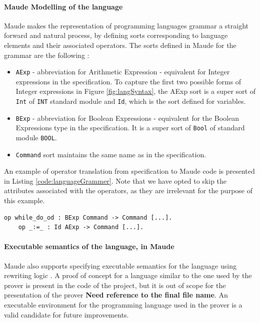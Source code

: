 \documentclass[12pt,a4paper]{article}
\begin{document}
{\paragraph{Maude Modelling of the language}
Maude makes the representation of programming languages grammar a straight forward and natural process, by defining sorts corresponding to language elements and their associated operators. The sorts defined in Maude for the grammar are the following : 
\begin{itemize}
	\item \texttt{AExp} - abbreviation for Arithmetic Expression - equivalent for Integer expressions in the specification. To capture the first two possible forms of Integer expressions in Figure \ref{fig:langSyntax}, the AExp sort is a super sort of \texttt{Int} of \texttt{INT} standard module and \texttt{Id}, which is the sort defined for variables.
	\item \texttt{BExp} - abbreviation for Boolean Expressions - equivalent for the Boolean Expressions type in the specification. It is a super sort of \texttt{Bool} of standard module \texttt{BOOL}. 
	\item \texttt{Command} sort maintains the same name as in the specification.
\end{itemize}
An example of operator translation from specification to Maude code is presented in Listing \ref{code:languageGrammer}. Note that we have opted to skip the attributes associated with the operators, as they are irrelevant for the purpose of this example.
\\

\begin{lstlisting}[label=code:languageGrammer,caption=Example of operator translation to Maude code]
	op while_do_od : BExp Command -> Command [...].
	op _:=_ : Id AExp -> Command [...]. 
\end{lstlisting}

\paragraph{Executable semantics of the language, in Maude}
Maude also supports specifying executable semantics for the language using rewriting logic \cite{rewrConcurrency}. A proof of concept for a language similar to the one used by the prover is present in the code of the project, but it is out of scope for the presentation of the prover \textbf{Need reference to the final file name}. An executable environment for the programming language used in the prover is a valid candidate for future improvements.
}
\end{document}
